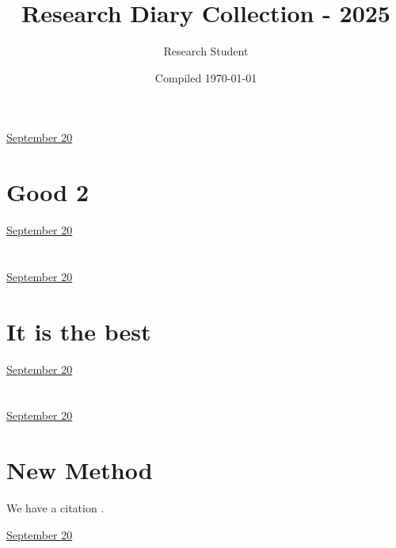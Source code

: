 \documentclass[letterpaper,11pt]{article}
\title{Research Diary Collection - 2025}
\author{Research Student}
\date{Compiled \today}
\begin{document}
\tableofcontents
\thispagestyle{empty}
\newpage


\href{run:2025-09-20-2.tex}{\Huge September 20} %

\section*{Good 2}



\clearpage


\href{run:2025-09-20-3.tex}{\Huge September 20} %

\section*{ }



\clearpage


\href{run:2025-09-20-best.tex}{\Huge September 20} %

\section{It is the best} 



\clearpage


\href{run:2025-09-20-corrected-test.tex}{\Huge September 20} %

\section*{ }



\clearpage


\href{run:2025-09-20-newmethod.tex}{\Huge September 20} %

\section{New Method}

We have a citation \cite{research_methods2024}.


\clearpage


\href{run:2025-09-20-test-auto-open.tex}{\Huge September 20} %
\end{document}
